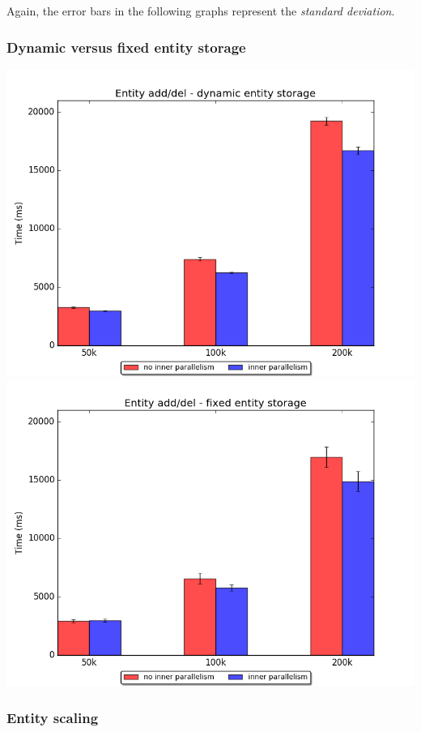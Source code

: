 \documentclass[oneside, 12pt, a4paper, openany]{book}
\begin{document}
Again, the error bars in the following graphs represent the
\emph{standard deviation}.

\subsubsection{Dynamic versus fixed entity
storage}\label{dynamic-versus-fixed-entity-storage-1}

\includegraphics{source/figures/bench2/ipcomp_dynamic.png}
\includegraphics{source/figures/bench2/ipcomp_fixed.png}

\subsubsection{Entity scaling}\label{entity-scaling-1}
\end{document}
